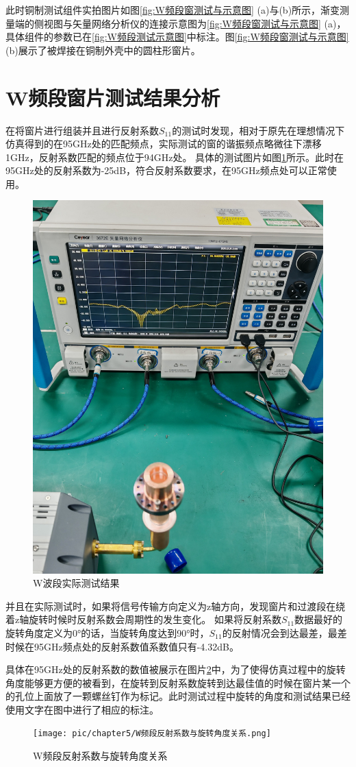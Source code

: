 \documentclass[master]{thesis-uestc}
\begin{document}
此时铜制测试组件实拍图片如图\ref{fig:W频段窗测试与示意图} (a)与(b)所示，渐变测量端的侧视图与矢量网络分析仪的连接示意图为\ref{fig:W频段窗测试与示意图} (a)，具体组件的参数已在\ref{fig:W频段测试示意图}中标注。图\ref{fig:W频段窗测试与示意图} (b)展示了被焊接在铜制外壳中的圆柱形窗片。

\section{W频段窗片测试结果分析}
在将窗片进行组装并且进行反射系数$S_{11}$的测试时发现，相对于原先在理想情况下仿真得到的在95GHz处的匹配频点，实际测试的窗的谐振频点略微往下漂移1GHz，反射系数匹配的频点位于94GHz处。
具体的测试图片如图\ref{fig:W波段实际测试结果}所示。此时在95GHz处的反射系数为-25dB，符合反射系数要求，在95GHz频点处可以正常使用。
\begin{figure}[!htb]
    \centering
    \includegraphics[width=0.35\linewidth]{pic/chapter5/实际测试的W波导窗.jpg}
    \caption{W波段实际测试结果}
    \label{fig:W波段实际测试结果}
\end{figure}

并且在实际测试时，如果将信号传输方向定义为z轴方向，发现窗片和过渡段在绕着z轴旋转时候时反射系数会周期性的发生变化。
如果将反射系数$S_{11}$数据最好的旋转角度定义为0°的话，当旋转角度达到90°时，$S_{11}$的反射情况会到达最差，最差时候在95GHz频点处的反射系数值系数值只有-4.32dB。

具体在95GHz处的反射系数的数值被展示在图片\ref{fig:W频段反射系数与旋转角度关系}中，为了使得仿真过程中的旋转角度能够更方便的被看到，在旋转到反射系数旋转到达最佳值的时候在窗片某一个的孔位上面放了一颗螺丝钉作为标记。此时测试过程中旋转的角度和测试结果已经使用文字在图中进行了相应的标注。
\begin{figure}[!htb]
    \centering
    \texttt{[image: pic/chapter5/W频段反射系数与旋转角度关系.png]}
    \caption{W频段反射系数与旋转角度关系}
    \label{fig:W频段反射系数与旋转角度关系}
\end{figure}
\end{document}
